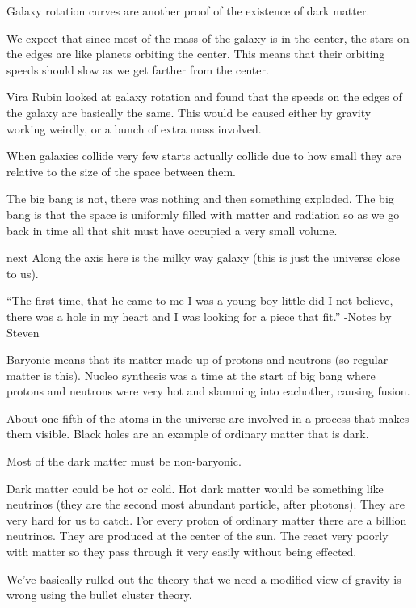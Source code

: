 \documentclass{article}
\begin{document}

Galaxy rotation curves are another proof of the existence of dark matter.

We expect that since most of the mass of the galaxy is in the center, the stars on the edges are like planets orbiting the center. This means that their orbiting speeds should slow as we get farther from the center.

Vira Rubin looked at galaxy rotation and found that the speeds on the edges of the galaxy are basically the same. This would be caused either by gravity working weirdly, or a bunch of extra mass involved.


When galaxies collide very few starts actually collide due to how small they are relative to the size of the space between them.


The big bang is not, there was nothing and then something exploded. The big bang is that the space is uniformly filled with matter and radiation so as we go back in time all that shit must have occupied a very small volume.

 next
Along the axis here is the milky way galaxy (this is just the universe close to us).


``The first time, that he came to me I was a young boy little did I not believe, there was a hole in my heart and I was looking for a piece that fit.''
-Notes by Steven


Baryonic means that its matter made up of protons and neutrons (so regular matter is this). Nucleo synthesis was a time at the start of big bang where protons and neutrons were very hot and slamming into eachother, causing fusion.

About one fifth of the atoms in the universe are involved in a process that makes them visible. Black holes are an example of ordinary matter that is dark.

Most of the dark matter must be non-baryonic.


Dark matter could be hot or cold. Hot dark matter would be something like neutrinos (they are the second most abundant particle, after photons). They are very hard for us to catch. For every proton of ordinary matter there are a billion neutrinos. They are produced at the center of the sun. The react very poorly with matter so they pass through it very easily without being effected.


We've basically rulled out the theory that we need a modified view of gravity is wrong using the bullet cluster theory.
\end{document}
